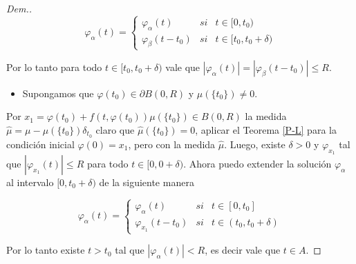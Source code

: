 \begin{proof}[Dem.]
$$\varphi_\alpha(t)=\left\{\begin{array}{ccc}
    \varphi_\alpha(t) & si &  t\in[0,t_0)\\
     \varphi_\beta(t-t_0) & si &t\in[t_0,t_0+\delta) 
\end{array}\right.$$

Por lo tanto para todo $t\in[t_0,t_0+\delta)$ vale que $|\varphi_\alpha(t)|=|\varphi_\beta(t-t_0)|\leq R$. 


    
    \begin{itemize}
        
    
    \item Supongamos que  $\varphi(t_0)\in \partial B(0,R)$ y $\mu(\{t_0\})\neq 0$.
    
    \end{itemize}
 
Por   $x_1=\varphi(t_0)+f(t,\varphi(t_0))\mu(\{t_0\})\in B(0,R)$ la medida $\hat{\mu}=\mu-\mu(\{t_0\})\delta_{t_0}$ claro que $\hat{\mu}(\{t_0\})=0$,  aplicar el Teorema \ref{P-L} para la condición inicial $\varphi(0)=x_1$, pero con la medida $\hat{\mu}$.  Luego, existe $\delta>0$  y $\varphi_{x_1}$   tal que $|\varphi_{x_1}(t)|\leq R$ para todo $t\in [0,0+\delta)$. Ahora puedo extender la solución $\varphi_\alpha$ al intervalo $[0,t_0+\delta)$  de la siguiente manera
 
$$\varphi_\alpha(t)=\left\{\begin{array}{ccc}
    \varphi_\alpha(t) & si &  t\in[0,t_0]\\
     \varphi_{x_1}(t-t_0) & si &t\in(t_0,t_0+\delta) 
\end{array}\right.$$
 
Por lo tanto existe $t>t_0$ tal que $|\varphi_\alpha(t)|<R$, es decir vale que $t\in A$.  
 



 		




\end{proof}
